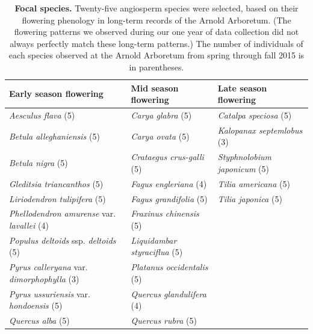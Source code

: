 \documentclass{article}
\begin{document}
\begin{table}[p]
  \caption{\textbf{Focal species.} Twenty-five angiosperm species were selected, based on their flowering phenology in long-term records of the Arnold Arboretum. (The flowering patterns we observed during our one year of data collection did not always perfectly match these long-term patterns.) The number of individuals of each species observed at the Arnold Arboretum from spring through fall 2015 is in parentheses.}
\begin{footnotesize} 
   \begin{tabular}{| p{5.5cm} | p{5.5cm} | p{5.5cm} |}
    \hline
  \bf{Early season flowering} & \bf{Mid season flowering} & \bf{Late season flowering} \\ \hline
    \textit{Aesculus flava} (5) & \textit{Carya glabra} (5) & \textit{Catalpa speciosa} (5) \\ 
    \textit{Betula alleghaniensis} (5) & \textit{Carya ovata} (5) & \textit{Kalopanax septemlobus} (3) \\ 
    \textit{Betula nigra} (5) & \textit{Crataegus crus-galli} (5) & \textit{Styphnolobium japonicum} (5) \\ 
\textit{Gleditsia triancanthos} (5) & \textit{Fagus engleriana} (4) & \textit{Tilia americana} (5) \\ 
\textit{Liriodendron tulipifera} (5) & \textit{Fagus grandifolia} (5) & \textit{Tilia japonica} (5) \\ 
\textit{Phellodendron amurense} var. \textit{lavallei} (4) & \textit{Fraxinus chinensis} (5) &\\ \textit{Populus deltoids} ssp. \textit{deltoids} (5) & \textit{Liquidambar styraciflua} (5) & \\ 
\textit{Pyrus calleryana} var. \textit{dimorphophylla} (3) & \textit{Platanus occidentalis} (5) & \\ 
\textit{Pyrus ussuriensis} var. \textit{hondoensis} (5) & \textit{Quercus glandulifera} (4) & \\ \textit{Quercus alba} (5) & \textit{Quercus rubra} (5) &  \\ \hline
     \end{tabular}    
\end{footnotesize} 
    \end{table}
\clearpage
\end{document}
